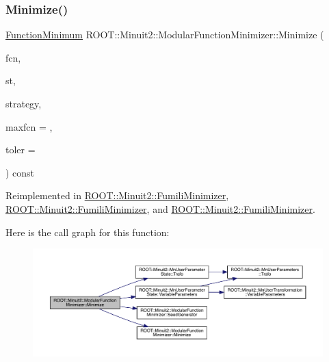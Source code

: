 \subsubsection{\texorpdfstring{Minimize()}{Minimize()}\hspace{0.1cm}{\footnotesize\ttfamily [30/33]}}
{\footnotesize\ttfamily \mbox{\hyperlink{classROOT_1_1Minuit2_1_1FunctionMinimum}{Function\+Minimum}} R\+O\+O\+T\+::\+Minuit2\+::\+Modular\+Function\+Minimizer\+::\+Minimize (\begin{DoxyParamCaption}\item[{const \mbox{\hyperlink{classROOT_1_1Minuit2_1_1FCNGradientBase}{F\+C\+N\+Gradient\+Base}} \&}]{fcn,  }\item[{const \mbox{\hyperlink{classROOT_1_1Minuit2_1_1MnUserParameterState}{Mn\+User\+Parameter\+State}} \&}]{st,  }\item[{const \mbox{\hyperlink{classROOT_1_1Minuit2_1_1MnStrategy}{Mn\+Strategy}} \&}]{strategy,  }\item[{unsigned int}]{maxfcn = {},  }\item[{double}]{toler = {} }\end{DoxyParamCaption}) const\hspace{0.3cm}{\ttfamily [virtual]}}



Reimplemented in \mbox{\hyperlink{classROOT_1_1Minuit2_1_1FumiliMinimizer_afe0f09e5e093e65ac8fadc13c459ad5c}{R\+O\+O\+T\+::\+Minuit2\+::\+Fumili\+Minimizer}}, \mbox{\hyperlink{classROOT_1_1Minuit2_1_1FumiliMinimizer_a2bffd3a7c3090b841f8c23248b83b16e}{R\+O\+O\+T\+::\+Minuit2\+::\+Fumili\+Minimizer}}, and \mbox{\hyperlink{classROOT_1_1Minuit2_1_1FumiliMinimizer_a2bffd3a7c3090b841f8c23248b83b16e}{R\+O\+O\+T\+::\+Minuit2\+::\+Fumili\+Minimizer}}.

Here is the call graph for this function\+:
\nopagebreak
\begin{figure}[H]
\begin{center}
\leavevmode
\includegraphics[width=350pt]{d3/dc8/classROOT_1_1Minuit2_1_1ModularFunctionMinimizer_a2e1e21161544b931511204cdedac914d_cgraph}
\end{center}
\end{figure}
\mbox{\label{classROOT_1_1Minuit2_1_1ModularFunctionMinimizer_ac2b4ce9fa735f5014f610fd0374c58e4}} 
